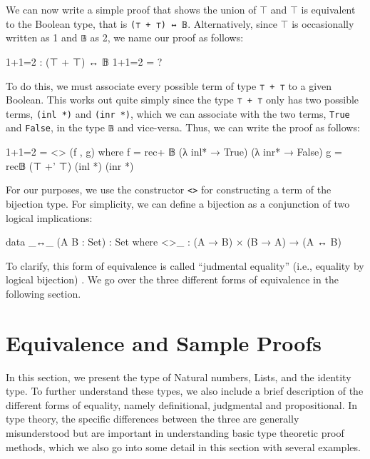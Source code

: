 \documentclass[12pt]{article}
\begin{document}
We can now write a simple proof that shows the union of \(\top\) and \(\top\)
is equivalent to the Boolean type, that is {\tt (⊤ + ⊤) ↔ 𝔹}.
Alternatively, since \(\top\) is occasionally written as 1 and {\tt 𝔹} as 2, we
name our proof as follows:
\begin{center}
\begin{minipage}{0.9\textwidth}
\begin{code}
1+1=2 : (⊤ + ⊤) ↔ 𝔹
1+1=2 = ?
\end{code}
\end{minipage}
\end{center}
To do this, we must associate every possible term of type {\tt ⊤ + ⊤} to a
given Boolean. This works out quite simply since the type {\tt ⊤ + ⊤} only has
two possible terms, {\tt (inl *)} and {\tt (inr *)}, which we can associate with
the two terms, {\tt True} and {\tt False}, in the type {\tt 𝔹} and vice-versa.
Thus, we can write the proof as follows:
\begin{center}
\begin{minipage}{0.9\textwidth}
\begin{code}
1+1=2 = <> (f , g)
  where f = rec+ 𝔹 (λ inl* → True) (λ inr* → False)
        g = rec𝔹 (⊤ +' ⊤) (inl *) (inr *)
\end{code}
\end{minipage}
\end{center}
For our purposes, we use the constructor {\tt <>} for constructing a term of
the bijection type. For simplicity, we can define a bijection as a conjunction
of two logical implications:
\begin{center}
\begin{minipage}{0.9\textwidth}
\begin{code}
data _↔_ (A B : Set) : Set where
  <>_ : (A → B) × (B → A) → (A ↔ B)
\end{code}
\end{minipage}
\end{center}
To clarify, this form of equivalence is called ``judmental equality'' (i.e.,
equality by logical bijection) \cite{}. We go over the three different forms of
equivalence in the following section.

\section{Equivalence and Sample Proofs}
In this section, we present the type of Natural numbers, Lists, and the identity
type. To further understand these types, we also include a brief description of
the different forms of equality, namely definitional, judgmental and
propositional. In type theory, the specific differences between the three are
generally misunderstood but are important in understanding basic type theoretic
proof methods, which we also go into some detail in this section with several
examples.
\end{document}
